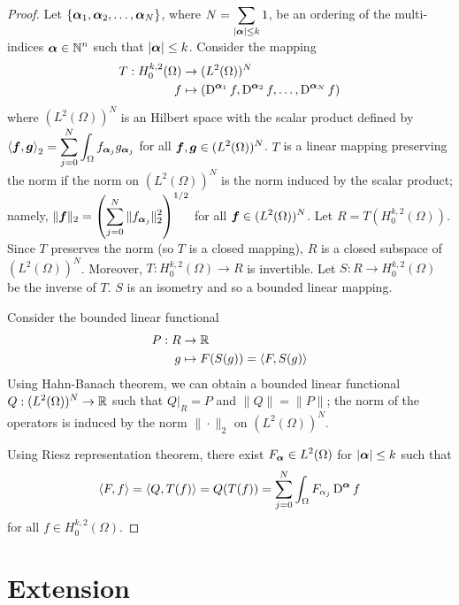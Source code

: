 \begin{proof}
Let $\displaystyle \left\{ {\bm{\alpha}}_1, {\bm{\alpha}}_2, \ldots,
{\bm{\alpha}}_N \right\}$,
where $\displaystyle N = \sum_{|{\bm{\alpha}}|\leq k} 1$, be an ordering of
the multi-indices $\displaystyle {\bm{\alpha}} \in \mathbb{N}^n$ such that
$|{\bm{\alpha}}|\leq k$.
Consider the mapping
\begin{align*}
T: H^{k,2}_0(\Omega) & \rightarrow (L^2(\Omega))^N \\
f &\mapsto \left( \operatorname{D}^{{\bm{\alpha}}_1} f , \operatorname{D}^{{\bm{\alpha}}_2} f, \ldots,
\operatorname{D}^{{\bm{\alpha}}_N} f \right)
\end{align*}
where $\displaystyle (L^2(\Omega))^N$ is an Hilbert space with the
scalar product defined by
$\displaystyle \left\langle{{\bm{f}}} , {{\bm{g}}}\right\rangle_2 =
\sum_{j=0}^N \int_\Omega f_{{\bm{\alpha}}_j} g_{{\bm{\alpha}}_j}$
for all $\displaystyle {\bm{f}}, {\bm{g}} \in (L^2(\Omega))^N$.
$T$ is a linear mapping preserving the norm if the norm on
$\displaystyle (L^2(\Omega))^N$ is the norm induced by the scalar
product; namely,
$\displaystyle \| {\bm{f}} \|_2 =
\left( \sum_{j=0}^N \| f_{{\bm{\alpha}}_j} \|_2^2 \right)^{1/2}$
for all $\displaystyle {\bm{f}} \in (L^2(\Omega))^N$.
Let $\displaystyle R = T(H^{k,2}_0(\Omega))$.  Since $T$ preserves the
norm (so $T$ is a closed mapping), $R$ is a closed subspace of
$\displaystyle (L^2(\Omega))^N$.  Moreover,
$\displaystyle T:H^{k,2}_0(\Omega) \rightarrow R$ is invertible.  Let
$S:R\rightarrow H^{k,2}_0(\Omega)$ be the inverse of $T$.  $S$ is
an isometry and so a bounded linear mapping.

Consider the bounded linear functional
\begin{align*}
P:R &\rightarrow \mathbb{R} \\
g &\mapsto  F(S(g)) = \left\langle{F} , {S(g)}\right\rangle
\end{align*}
Using Hahn-Banach theorem, we can obtain a bounded linear functional
$\displaystyle Q: (L^2(\Omega))^N \rightarrow \mathbb{R}$ such that
$\displaystyle Q\big|_R = P$ and $\|Q\| = \|P\|$; the norm of the
operators is induced by the norm $\|\cdot\|_2$ on
$\displaystyle (L^2(\Omega))^N$.

Using Riesz representation theorem, there exist
$\displaystyle F_{{\bm{\alpha}}} \in L^2(\Omega)$ for
$|{\bm{\alpha}}|\leq k$ such that
\[
\left\langle{F} , {f}\right\rangle = \left\langle{Q} , {T(f)}\right\rangle = Q(T(f))
= \sum_{j=0}^N \int_\Omega F_{\alpha_j} \operatorname{D}^{{\bm{\alpha}}} f 
\]
for all $\displaystyle f \in H^{k,2}_0(\Omega)$.
\end{proof}

\section{Extension}

